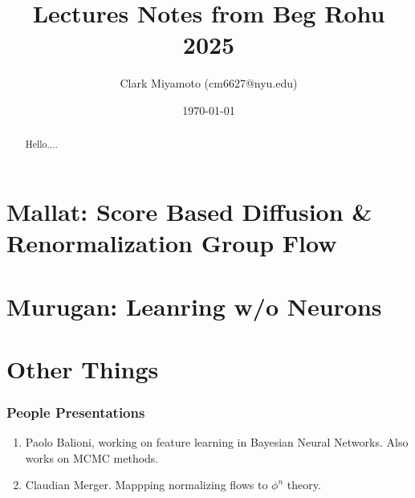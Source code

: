 \documentclass[12pt,fleqn]{article}
\title{Lectures Notes from Beg Rohu 2025}
\author{Clark Miyamoto (cm6627@nyu.edu)}
\date{\today}
\numberwithin{equation}{section} %
\begin{document}
\maketitle
\begin{abstract}
	Hello....
\end{abstract}

\tableofcontents
\newpage

\part{Mallat: Score Based Diffusion \& Renormalization Group Flow}


\part{Murugan: Leanring w/o Neurons}



\newpage

\part{Other Things}

\section{People Presentations} 
\begin{enumerate}
	\item Paolo Balioni, working on feature learning in Bayesian Neural Networks. Also works on MCMC methods.
	\item Claudian Merger. Mappping normalizing flows to $\phi^n$ theory.
\end{enumerate}
\end{document}
